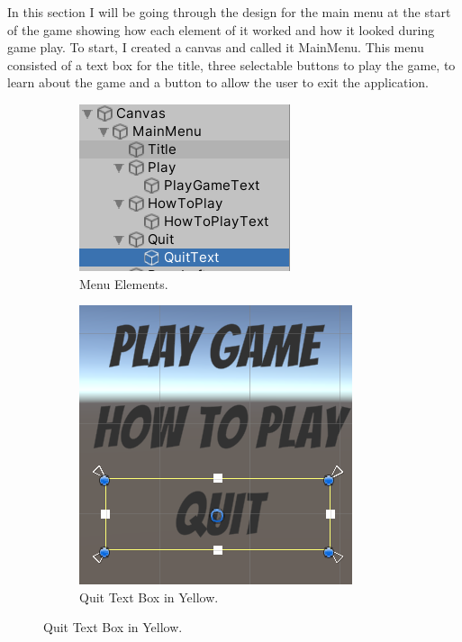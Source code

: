 In this section I will be going through the design for the main menu at the start of the game showing how each element of it worked and how it looked during game play. To start, I created a canvas and called it MainMenu. This menu consisted of a text box for the title, three selectable buttons to play the game, to learn about the game and a button to allow the user to exit the application. 

\begin{figure}[h]
\centering
\begin{subfigure}{.5\textwidth}
\centering
  \includegraphics[width= 0.5\linewidth]{Images/MainMenuElements.PNG}
  \caption{Menu Elements.}
  \label{fig:MenuEle}
  \end{subfigure}%
  \begin{subfigure}{.5\textwidth}
\centering
  \includegraphics[width= 0.5\linewidth]{Images/TextBox.PNG}
  \caption{Quit Text Box in Yellow.}
  \label{fig:TextBox}
  \end{subfigure}%
\end{figure}
\newpage

